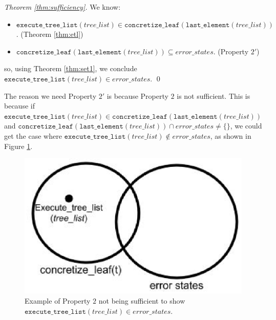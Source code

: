 \begin{proof}[Theorem \ref{thm:sufficiency}]
We know:
\begin{itemize}
\item $\mathtt{execute\_tree\_list}(tree\_list) \in \mathtt{concretize\_leaf}(\mathtt{last\_element}(tree\_list))$. (Theorem \ref{thm:etl})
\item $\mathtt{concretize\_leaf} (\mathtt{last\_element} (tree\_list)) \subseteq error\_states$. (Property $2'$)
\end{itemize}
so, using Theorem \ref{thm:set1}, we conclude
$\mathtt{execute\_tree\_list} (tree\_list) \in error\_states$. \qed
\end{proof}

The reason we need Property $2'$ is because Property $2$ is not sufficient. This is because if $\mathtt{execute\_tree\_list} (tree\_list) \in \mathtt{concretize\_leaf} (\mathtt{last\_element}(tree\_list))$ and $\mathtt{concretize\_leaf} (\mathtt{last\_element} (tree\_list)) \cap error\_states \neq \{\}$, we could get the case where
$\mathtt{execute\_tree\_list} (tree\_list) \notin error\_states$, as shown in Figure \ref{fig:Prop2}.

\begin{figure}
\label{fig:Prop2}
\includegraphics[width=\textwidth]{prop2.eps}
\caption{Example of Property $2$ not being sufficient to show $\mathtt{execute\_tree\_list} (tree\_list) \in error\_states$.}
\end{figure}




